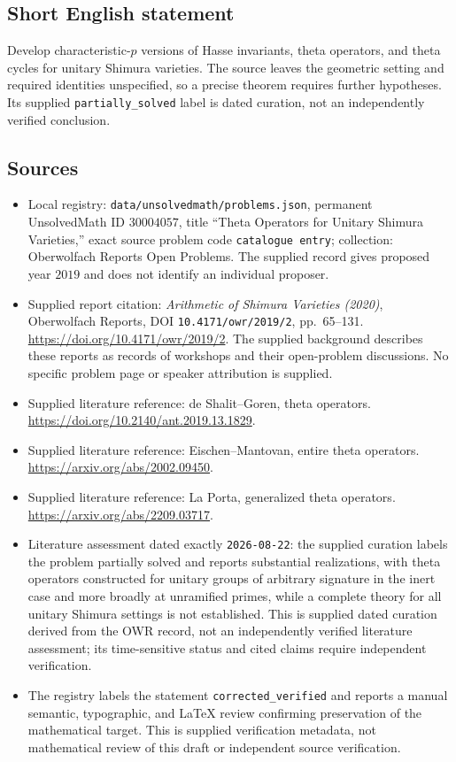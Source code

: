 \documentclass[11pt]{article}
\begin{document}
\subsection{Short English statement}
Develop characteristic-\(p\) versions of Hasse invariants, theta operators, and theta cycles for unitary Shimura varieties. The source leaves the geometric setting and required identities unspecified, so a precise theorem requires further hypotheses. Its supplied \texttt{partially\_solved} label is dated curation, not an independently verified conclusion.
\subsection{Sources}
\begin{itemize}
\item Local registry: \texttt{data/unsolvedmath/problems.json}, permanent UnsolvedMath ID \(30004057\), title ``Theta Operators for Unitary Shimura Varieties,'' exact source problem code \texttt{catalogue entry}; collection: Oberwolfach Reports Open Problems. The supplied record gives proposed year \(2019\) and does not identify an individual proposer.
\item Supplied report citation: \emph{Arithmetic of Shimura Varieties (2020)}, Oberwolfach Reports, DOI \texttt{10.4171/owr/2019/2}, pp.\ 65--131. \url{https://doi.org/10.4171/owr/2019/2}. The supplied background describes these reports as records of workshops and their open-problem discussions. No specific problem page or speaker attribution is supplied.
\item Supplied literature reference: de Shalit--Goren, theta operators. \url{https://doi.org/10.2140/ant.2019.13.1829}.
\item Supplied literature reference: Eischen--Mantovan, entire theta operators. \url{https://arxiv.org/abs/2002.09450}.
\item Supplied literature reference: La Porta, generalized theta operators. \url{https://arxiv.org/abs/2209.03717}.
\item Literature assessment dated exactly \texttt{2026-08-22}: the supplied curation labels the problem partially solved and reports substantial realizations, with theta operators constructed for unitary groups of arbitrary signature in the inert case and more broadly at unramified primes, while a complete theory for all unitary Shimura settings is not established. This is supplied dated curation derived from the OWR record, not an independently verified literature assessment; its time-sensitive status and cited claims require independent verification.
\item The registry labels the statement \texttt{corrected\_verified} and reports a manual semantic, typographic, and LaTeX review confirming preservation of the mathematical target. This is supplied verification metadata, not mathematical review of this draft or independent source verification.
\end{itemize}
\end{document}
